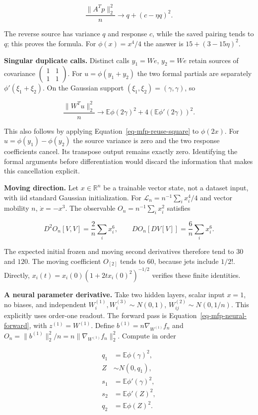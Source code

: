 \documentclass[
  11pt,
]{article}
\theoremstyle{definition}
\theoremstyle{plain}
\theoremstyle{plain}
\theoremstyle{plain}
\theoremstyle{remark}
\begin{document}
\[
\frac{\|A^Tp\|_2^2}{n}\longrightarrow q+(c-\eta q)^2.
\]

The reverse source has variance \(q\) and response \(c\), while the
saved pairing tends to \(q\); this proves the formula. For
\(\phi(x)=x^4/4\) the answer is \(15+(3-15\eta)^2\).

\textbf{Singular duplicate calls.} Distinct calls \(y_1=We\), \(y_2=We\)
retain sources of covariance
\(\left(\begin{smallmatrix}1&1\\1&1\end{smallmatrix}\right)\). For
\(u=\phi(y_1+y_2)\) the two formal partials are separately
\(\phi'(\xi_1+\xi_2)\). On the Gaussian support
\((\xi_1,\xi_2)=(\gamma,\gamma)\), so

\[
\frac{\|W^Tu\|_2^2}{n}\longrightarrow
\mathbb E\phi(2\gamma)^2+4(\mathbb E\phi'(2\gamma))^2.
\]

This also follows by applying Equation~\ref{eq-mfp-reuse-square} to
\(\phi(2x)\). For \(u=\phi(y_1)-\phi(y_2)\) the source variance is zero
and the two response coefficients cancel. Its transpose output remains
exactly zero. Identifying the formal arguments before differentiation
would discard the information that makes this cancellation explicit.

\textbf{Moving direction.} Let \(x\in\mathbb R^n\) be a trainable vector
state, not a dataset input, with iid standard Gaussian initialization.
For \(\mathcal L_n=n^{-1}\sum_i x_i^4/4\) and vector mobility \(n\),
\(\dot x=-x^3\). The observable \(O_n=n^{-1}\sum_i x_i^2\) satisfies

\[
D^2O_n[V,V]=\frac2n\sum_i x_i^6,\qquad
DO_n[DV[V]]=\frac6n\sum_i x_i^6.
\]

The expected initial frozen and moving second derivatives therefore tend
to \(30\) and \(120\). The moving coefficient \(O_{[2]}\) tends to
\(60\), because jets include \(1/2!\). Directly,
\(x_i(t)=x_i(0)(1+2t x_i(0)^2)^{-1/2}\) verifies these finite
identities.

\textbf{A neural parameter derivative.} Take two hidden layers, scalar
input \(x=1\), no biases, and independent
\(W_i^{(1)},W_i^{(3)}\sim N(0,1)\), \(W_{ij}^{(2)}\sim N(0,1/n)\). This
explicitly uses order-one readout. The forward pass is
Equation~\ref{eq-mfp-neural-forward}, with \(z^{(1)}=W^{(1)}\). Define
\(b^{(1)}=n\nabla_{W^{(1)}}f_n\) and
\(O_n=\|b^{(1)}\|_2^2/n=n\|\nabla_{W^{(1)}}f_n\|_2^2\). Compute in order

\[
\begin{aligned}
q_1&=\mathbb E\phi(\gamma)^2,\\
Z&\sim N(0,q_1),\\
s_1&=\mathbb E\phi'(\gamma)^2,\\
s_2&=\mathbb E\phi'(Z)^2,\\
q_2&=\mathbb E\phi(Z)^2.
\end{aligned}
\]
\end{document}
